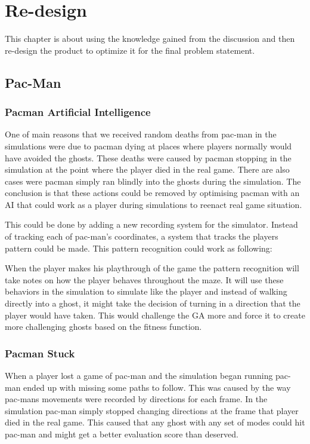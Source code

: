\section{Re-design} \label{sec:redesign}

This chapter is about using the knowledge gained from the discussion and then re-design the product to optimize it for the final problem statement.

\subsection{Pac-Man}


\subsubsection{Pacman Artificial Intelligence}

One of main reasons that we received random deaths from pac-man in the simulations were due to pacman dying at places where players normally would have avoided the ghosts. These deaths were caused by pacman stopping in the simulation at the point where the player died in the real game. There are also cases were pacman simply ran blindly into the ghosts during the simulation. The conclusion is that these actions could be removed by optimising pacman with an AI that could work as a player during simulations to reenact real game situation.

This could be done by adding a new recording system for the simulator. Instead of tracking each of pac-man's coordinates, a system that tracks the players pattern could be made. This pattern recognition could work as following:

When the player makes his playthrough of the game the pattern recognition will take notes on how the player behaves throughout the maze. It will use these behaviors in the simulation to simulate like the player and instead of walking directly into a ghost, it might take the decision of turning in a direction that the player would have taken. This would challenge the GA  more and force it to create more challenging ghosts based on the fitness function.



\subsubsection{Pacman Stuck}

When a player lost a game of pac-man and the simulation began running pac-man ended up with missing some paths to follow. This was caused by the way pac-mans movements were recorded by directions for each frame. In the simulation pac-man simply stopped changing directions at the frame that player died in the real game. This caused that any ghost with any set of modes could hit pac-man and might get a better evaluation score than deserved.


